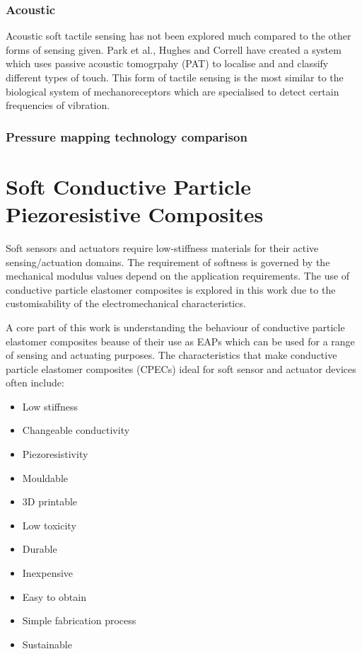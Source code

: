 \subsubsection{Acoustic}
Acoustic soft tactile sensing has not been explored much compared to the other forms of sensing given. Park et al., Hughes and Correll \cite{Park2022,Hughes2015} have created a system which uses passive acoustic tomogrpahy (PAT) to localise and and classify different types of touch. This form of tactile sensing is the most similar to the biological system of mechanoreceptors which are specialised to detect certain frequencies of vibration.

\subsubsection{Pressure mapping technology comparison}

\section{Soft Conductive Particle Piezoresistive Composites}
\label{sec:Soft Piezoresistive Composites}
Soft sensors and actuators require low-stiffness materials for their active sensing/actuation domains. The requirement of softness is governed by the mechanical modulus values depend on the application requirements. The use of conductive particle elastomer composites is explored in this work due to the customisability of the electromechanical characteristics.

A core part of this work is understanding the behaviour of conductive particle elastomer composites beause of their use as EAPs which can be used for a range of sensing and actuating purposes. The characteristics that make conductive particle elastomer composites (CPECs) ideal for soft sensor and actuator devices often include:
\begin{itemize}
    \item Low stiffness
    \item Changeable conductivity
    \item Piezoresistivity
    \item Mouldable
    \item 3D printable
    \item Low toxicity
    \item Durable
    \item Inexpensive
    \item Easy to obtain
    \item Simple fabrication process
    \item Sustainable
\end{itemize}

